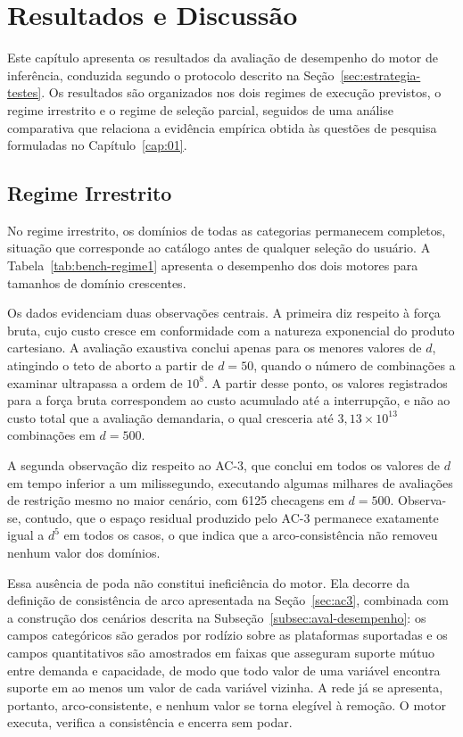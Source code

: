\chapter{Resultados e Discussão}
\label{cap:resultados}

Este capítulo apresenta os resultados da avaliação de desempenho do motor de inferência,
conduzida segundo o protocolo descrito na Seção~\ref{sec:estrategia-testes}. Os resultados
são organizados nos dois regimes de execução previstos, o regime irrestrito e o regime de
seleção parcial, seguidos de uma análise comparativa que relaciona a evidência empírica
obtida às questões de pesquisa formuladas no Capítulo~\ref{cap:01}.

\section{Regime Irrestrito}
\label{sec:resultado-irrestrito}

No regime irrestrito, os domínios de todas as categorias permanecem completos, situação que
corresponde ao catálogo antes de qualquer seleção do usuário. A
Tabela~\ref{tab:bench-regime1} apresenta o desempenho dos dois motores para tamanhos de
domínio crescentes.



Os dados evidenciam duas observações centrais. A primeira diz respeito à força bruta, cujo
custo cresce em conformidade com a natureza exponencial do produto cartesiano. A avaliação
exaustiva conclui apenas para os menores valores de $d$, atingindo o teto de aborto a partir
de $d=50$, quando o número de combinações a examinar ultrapassa a ordem de $10^8$. A partir
desse ponto, os valores registrados para a força bruta correspondem ao custo acumulado até a
interrupção, e não ao custo total que a avaliação demandaria, o qual cresceria até
$3{,}13\times10^{13}$ combinações em $d=500$.

A segunda observação diz respeito ao AC-3, que conclui em todos os valores de $d$ em tempo
inferior a um milissegundo, executando algumas milhares de avaliações de restrição mesmo no
maior cenário, com \num{6125} checagens em $d=500$. Observa-se, contudo, que o espaço residual
produzido pelo AC-3 permanece exatamente igual a $d^5$ em todos os casos, o que indica que a
arco-consistência não removeu nenhum valor dos domínios.

Essa ausência de poda não constitui ineficiência do motor. Ela decorre da definição de
consistência de arco apresentada na Seção~\ref{sec:ac3}, combinada com a construção dos
cenários descrita na Subseção~\ref{subsec:aval-desempenho}: os campos categóricos são gerados
por rodízio sobre as plataformas suportadas e os campos quantitativos são amostrados em faixas
que asseguram suporte mútuo entre demanda e capacidade, de modo que todo valor de uma variável
encontra suporte em ao menos um valor de cada variável vizinha. A rede já se apresenta,
portanto, arco-consistente, e nenhum valor se torna elegível à remoção. O motor executa,
verifica a consistência e encerra sem podar.

